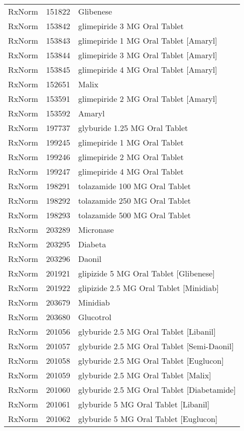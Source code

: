 \begin{longtable}{p{}p{}p{}}
  RxNorm & 151822 & Glibenese \\ 
  RxNorm & 153842 & glimepiride 3 MG Oral Tablet \\ 
  RxNorm & 153843 & glimepiride 1 MG Oral Tablet [Amaryl] \\ 
  RxNorm & 153844 & glimepiride 3 MG Oral Tablet [Amaryl] \\ 
  RxNorm & 153845 & glimepiride 4 MG Oral Tablet [Amaryl] \\ 
  RxNorm & 152651 & Malix \\ 
  RxNorm & 153591 & glimepiride 2 MG Oral Tablet [Amaryl] \\ 
  RxNorm & 153592 & Amaryl \\ 
  RxNorm & 197737 & glyburide 1.25 MG Oral Tablet \\ 
  RxNorm & 199245 & glimepiride 1 MG Oral Tablet \\ 
  RxNorm & 199246 & glimepiride 2 MG Oral Tablet \\ 
  RxNorm & 199247 & glimepiride 4 MG Oral Tablet \\ 
  RxNorm & 198291 & tolazamide 100 MG Oral Tablet \\ 
  RxNorm & 198292 & tolazamide 250 MG Oral Tablet \\ 
  RxNorm & 198293 & tolazamide 500 MG Oral Tablet \\ 
  RxNorm & 203289 & Micronase \\ 
  RxNorm & 203295 & Diabeta \\ 
  RxNorm & 203296 & Daonil \\ 
  RxNorm & 201921 & glipizide 5 MG Oral Tablet [Glibenese] \\ 
  RxNorm & 201922 & glipizide 2.5 MG Oral Tablet [Minidiab] \\ 
  RxNorm & 203679 & Minidiab \\ 
  RxNorm & 203680 & Glucotrol \\ 
  RxNorm & 201056 & glyburide 2.5 MG Oral Tablet [Libanil] \\ 
  RxNorm & 201057 & glyburide 2.5 MG Oral Tablet [Semi-Daonil] \\ 
  RxNorm & 201058 & glyburide 2.5 MG Oral Tablet [Euglucon] \\ 
  RxNorm & 201059 & glyburide 2.5 MG Oral Tablet [Malix] \\ 
  RxNorm & 201060 & glyburide 2.5 MG Oral Tablet [Diabetamide] \\ 
  RxNorm & 201061 & glyburide 5 MG Oral Tablet [Libanil] \\ 
  RxNorm & 201062 & glyburide 5 MG Oral Tablet [Euglucon] \\ 

\end{longtable}

